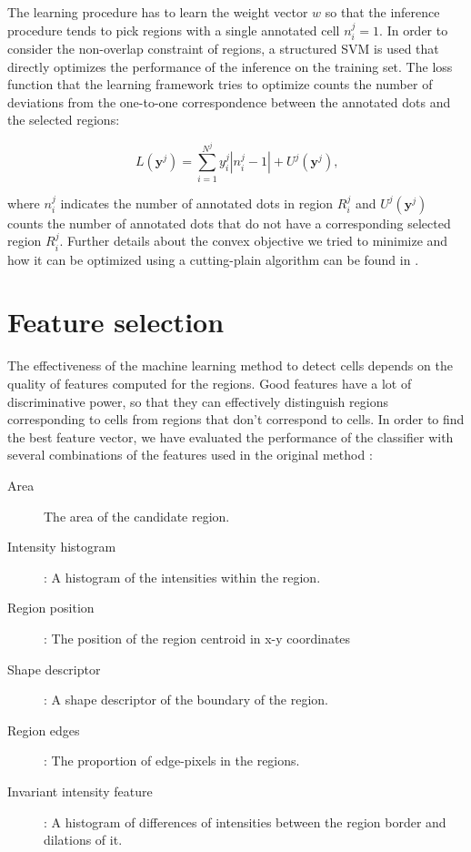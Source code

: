 	The learning procedure has to learn the weight vector $w$ so that the inference procedure tends to pick regions with a single annotated cell $n_i^j = 1$. In order to consider the non-overlap constraint of regions, a structured SVM \cite{tso04} is used that directly optimizes the performance of the inference on the training set. The loss function that the learning framework tries to optimize counts the number of deviations from the one-to-one correspondence between the annotated dots and the selected regions:
	
	\[
		L(\textbf{y}^j) = \sum_{i=1}^{N^j} y_i^j |n_i^j - 1| + U^j(\textbf{y}^j)\text{,}
	\]
	
	\noindent where $n_i^j$ indicates the number of annotated dots in region $R_i^j$ and $U^j(\textbf{y}^j)$ counts the number of annotated dots that do not have a corresponding selected region $R_i^j$. Further details about the convex objective we tried to minimize and how it can be optimized using a cutting-plain algorithm can be found in \cite{arteta12}.
		
	\section{Feature selection}
	\label{sec:detector_feature}
	
	The effectiveness of the machine learning method to detect cells depends on the quality of features computed for the regions. Good features have a lot of discriminative power, so that they can effectively distinguish regions corresponding to cells from regions that don't correspond to cells. In order to find the best feature vector, we have evaluated the performance of the classifier with several combinations of the features used in the original method \cite{arteta12}:
	
	\begin{description}
		\item[Area] The area of the candidate region.
		\item[Intensity histogram]: A histogram of the intensities within the region.
		\item[Region position]: The position of the region centroid in x-y coordinates
		\item[Shape descriptor]: A shape descriptor of the boundary of the region.
		\item[Region edges]: The proportion of edge-pixels in the regions.
		\item[Invariant intensity feature]: A histogram of differences of intensities between the region border and dilations of it.
	\end{description}
	
